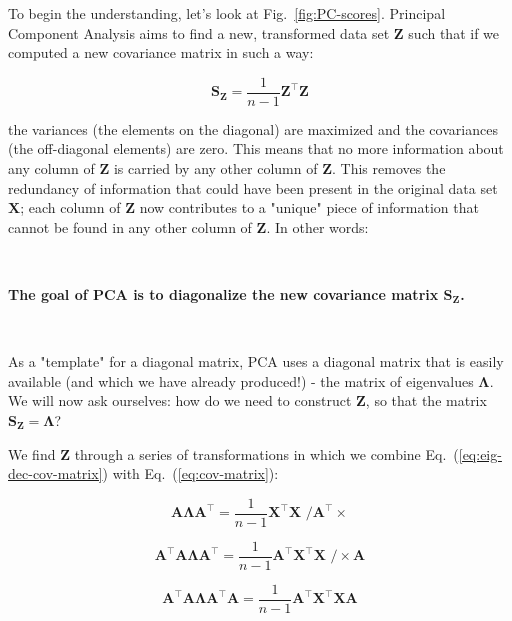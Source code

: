 \documentclass[10pt,twocolumn]{article}
\begin{document}
To begin the understanding, let's look at Fig.~\ref{fig:PC-scores}. Principal Component Analysis aims to find a new, transformed data set $\mathbf{Z}$ such that if we computed a new covariance matrix in such a way:

\begin{equation}
\mathbf{S_Z} =  \frac{1}{n-1} \mathbf{Z}^{\top} \mathbf{Z}
\end{equation}

the variances (the elements on the diagonal) are maximized and the covariances (the off-diagonal elements) are zero. This means that no more information about any column of $\mathbf{Z}$ is carried by any other column of $\mathbf{Z}$. This removes the redundancy of information that could have been present in the original data set $\mathbf{X}$; each column of $\mathbf{Z}$ now contributes to a "unique" piece of information that cannot be found in any other column of $\mathbf{Z}$. In other words:

\,\,

\textbf{The goal of PCA is to diagonalize the new covariance matrix $\mathbf{S_Z}$.}

\,\,

As a "template" for a diagonal matrix, PCA uses a diagonal matrix that is easily available (and which we have already produced!) - the matrix of eigenvalues $\mathbf{\Lambda}$. We will now ask ourselves: how do we need to construct $\mathbf{Z}$, so that the matrix $\mathbf{S_Z} = \mathbf{\Lambda}$?

We find $\mathbf{Z}$ through a series of transformations in which we combine Eq.~(\ref{eq:eig-dec-cov-matrix}) with Eq.~(\ref{eq:cov-matrix}):

\begin{equation}
\mathbf{A} \mathbf{\Lambda} \mathbf{A}^{\top} =  \frac{1}{n-1} \mathbf{X}^{\top} \mathbf{X} \,\, \Big/ \mathbf{A}^{\top} \times
\end{equation}

\begin{equation}
\mathbf{A}^{\top} \mathbf{A} \mathbf{\Lambda} \mathbf{A}^{\top} =  \frac{1}{n-1} \mathbf{A}^{\top}  \mathbf{X}^{\top} \mathbf{X} \,\, \Big/ \times \mathbf{A}
\end{equation}

\begin{equation}
\mathbf{A}^{\top} \mathbf{A} \mathbf{\Lambda} \mathbf{A}^{\top} \mathbf{A} =  \frac{1}{n-1} \mathbf{A}^{\top}  \mathbf{X}^{\top} \mathbf{X} \mathbf{A}
\end{equation}
\end{document}
